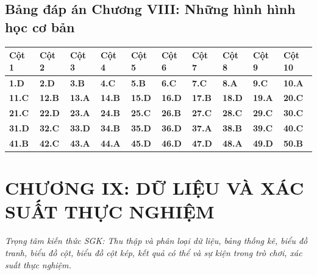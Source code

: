 \documentclass[11pt,a4paper]{article}
\begin{document}
\subsection*{\color{primary} Bảng đáp án Chương VIII: Những hình hình học cơ bản}
\begin{center}
\renewcommand{\arraystretch}{1.25}
\begin{tabularx}{\textwidth}{*{10}{>{\centering\arraybackslash}X}}
\toprule
\textbf{\color{primary} Cột 1} & \textbf{\color{primary} Cột 2} & \textbf{\color{primary} Cột 3} & \textbf{\color{primary} Cột 4} & \textbf{\color{primary} Cột 5} & \textbf{\color{primary} Cột 6} & \textbf{\color{primary} Cột 7} & \textbf{\color{primary} Cột 8} & \textbf{\color{primary} Cột 9} & \textbf{\color{primary} Cột 10} \\
\midrule
\textbf{1.D} & \textbf{2.D} & \textbf{3.B} & \textbf{4.C} & \textbf{5.B} & \textbf{6.C} & \textbf{7.C} & \textbf{8.A} & \textbf{9.C} & \textbf{10.A} \\
\rowcolor{rowtint} \textbf{11.C} & \textbf{12.B} & \textbf{13.A} & \textbf{14.B} & \textbf{15.D} & \textbf{16.D} & \textbf{17.B} & \textbf{18.D} & \textbf{19.A} & \textbf{20.C} \\
\textbf{21.C} & \textbf{22.D} & \textbf{23.A} & \textbf{24.B} & \textbf{25.C} & \textbf{26.B} & \textbf{27.C} & \textbf{28.C} & \textbf{29.C} & \textbf{30.C} \\
\rowcolor{rowtint} \textbf{31.D} & \textbf{32.C} & \textbf{33.D} & \textbf{34.B} & \textbf{35.D} & \textbf{36.D} & \textbf{37.A} & \textbf{38.B} & \textbf{39.C} & \textbf{40.C} \\
\textbf{41.B} & \textbf{42.C} & \textbf{43.A} & \textbf{44.A} & \textbf{45.D} & \textbf{46.D} & \textbf{47.D} & \textbf{48.A} & \textbf{49.D} & \textbf{50.B} \\
\bottomrule
\end{tabularx}
\end{center}\vspace{10pt}
\section*{\color{primary} CHƯƠNG IX: DỮ LIỆU VÀ XÁC SUẤT THỰC NGHIỆM}
\textit{Trọng tâm kiến thức SGK: Thu thập và phân loại dữ liệu, bảng thống kê, biểu đồ tranh, biểu đồ cột, biểu đồ cột kép, kết quả có thể và sự kiện trong trò chơi, xác suất thực nghiệm.}\par\vspace{4pt}
\end{document}
